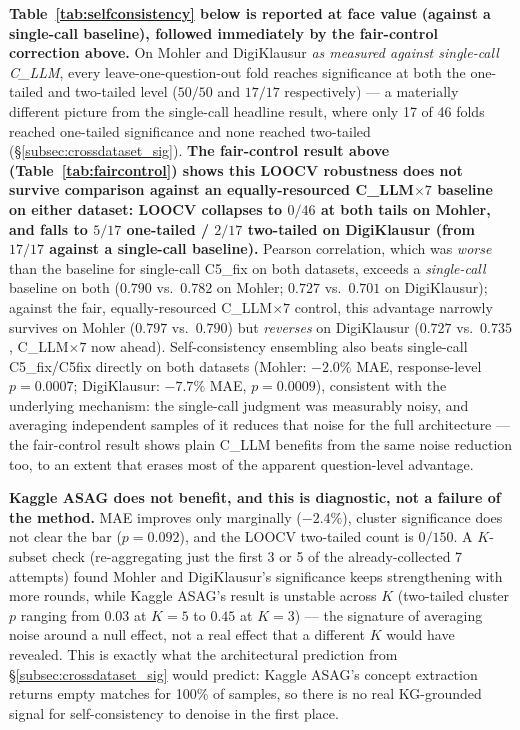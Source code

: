 \documentclass[conference]{IEEEtran}
\begin{document}
\textbf{Table~\ref{tab:selfconsistency} below is reported at face value
(against a single-call baseline), followed immediately by the fair-control
correction above.} On Mohler and DigiKlausur \emph{as measured against
single-call C\_LLM}, every leave-one-question-out fold reaches
significance at both the one-tailed and two-tailed level ($50/50$ and
$17/17$ respectively) --- a materially different picture from the
single-call headline result, where only 17 of 46 folds reached one-tailed
significance and none reached two-tailed
(\S\ref{subsec:crossdataset_sig}). \textbf{The fair-control result above
(Table~\ref{tab:faircontrol}) shows this LOOCV robustness does not
survive comparison against an equally-resourced C\_LLM$\times7$
baseline on either dataset: LOOCV collapses to $0/46$ at both tails on
Mohler, and falls to $5/17$ one-tailed / $2/17$ two-tailed on
DigiKlausur (from $17/17$ against a single-call baseline).} Pearson
correlation, which was \emph{worse} than the baseline for single-call
C5\_fix on both datasets, exceeds a \emph{single-call} baseline on both
($0.790$ vs.\ $0.782$ on Mohler; $0.727$ vs.\ $0.701$ on DigiKlausur);
against the fair, equally-resourced C\_LLM$\times7$ control, this
advantage narrowly survives on Mohler ($0.797$ vs.\ $0.790$) but
\emph{reverses} on DigiKlausur ($0.727$ vs.\ $0.735$, C\_LLM$\times7$
now ahead). Self-consistency ensembling also
beats single-call C5\_fix/C5fix directly on both datasets (Mohler:
$-2.0\%$ MAE, response-level $p=0.0007$; DigiKlausur: $-7.7\%$ MAE,
$p=0.0009$), consistent with the underlying mechanism: the single-call
judgment was measurably noisy, and averaging independent samples of it
reduces that noise for the full architecture --- the fair-control result
shows plain C\_LLM benefits from the same noise reduction too, to an
extent that erases most of the apparent question-level advantage.

\textbf{Kaggle ASAG does not benefit, and this is diagnostic, not a
failure of the method.} MAE improves only marginally ($-2.4\%$), cluster
significance does not clear the bar ($p=0.092$), and the LOOCV
two-tailed count is $0/150$. A $K$-subset check (re-aggregating just the
first 3 or 5 of the already-collected 7 attempts) found Mohler and
DigiKlausur's significance keeps strengthening with more rounds, while
Kaggle ASAG's result is unstable across $K$ (two-tailed cluster $p$
ranging from $0.03$ at $K{=}5$ to $0.45$ at $K{=}3$) --- the signature
of averaging noise around a null effect, not a real effect that a
different $K$ would have revealed. This is exactly what the
architectural prediction from \S\ref{subsec:crossdataset_sig} would
predict: Kaggle ASAG's concept extraction returns empty matches for
100\% of samples, so there is no real KG-grounded signal for
self-consistency to denoise in the first place.
\end{document}
